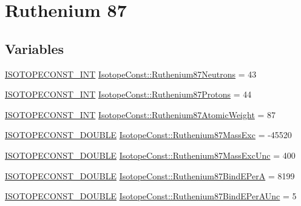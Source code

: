 \hypertarget{group___isotope_const-_ruthenium-_ru87}{}\section{Ruthenium 87}
\label{group___isotope_const-_ruthenium-_ru87}
\subsection*{Variables}
\begin{DoxyCompactItemize}
\item 
\mbox{\hyperlink{group___isotope_const-_macros_ga5f18360b3e99483a35c32d789e62621c}{I\+S\+O\+T\+O\+P\+E\+C\+O\+N\+S\+T\+\_\+\+I\+NT}} \mbox{\hyperlink{group___isotope_const-_ruthenium-_ru87_gaf2d2519843df393d99ad752be4768a2d}{Isotope\+Const\+::\+Ruthenium87\+Neutrons}} = 43
\item 
\mbox{\hyperlink{group___isotope_const-_macros_ga5f18360b3e99483a35c32d789e62621c}{I\+S\+O\+T\+O\+P\+E\+C\+O\+N\+S\+T\+\_\+\+I\+NT}} \mbox{\hyperlink{group___isotope_const-_ruthenium-_ru87_gab347314faee7a6a6e3c1c3dede76cc90}{Isotope\+Const\+::\+Ruthenium87\+Protons}} = 44
\item 
\mbox{\hyperlink{group___isotope_const-_macros_ga5f18360b3e99483a35c32d789e62621c}{I\+S\+O\+T\+O\+P\+E\+C\+O\+N\+S\+T\+\_\+\+I\+NT}} \mbox{\hyperlink{group___isotope_const-_ruthenium-_ru87_ga8ae57cbdb18f42a3463b75e4c5e5cc97}{Isotope\+Const\+::\+Ruthenium87\+Atomic\+Weight}} = 87
\item 
\mbox{\hyperlink{group___isotope_const-_macros_ga8f45a7272ce02c0b4c65c44636ed719a}{I\+S\+O\+T\+O\+P\+E\+C\+O\+N\+S\+T\+\_\+\+D\+O\+U\+B\+LE}} \mbox{\hyperlink{group___isotope_const-_ruthenium-_ru87_ga05d06d116b8eed3fcca034258c104a70}{Isotope\+Const\+::\+Ruthenium87\+Mass\+Exc}} = -\/45520
\item 
\mbox{\hyperlink{group___isotope_const-_macros_ga8f45a7272ce02c0b4c65c44636ed719a}{I\+S\+O\+T\+O\+P\+E\+C\+O\+N\+S\+T\+\_\+\+D\+O\+U\+B\+LE}} \mbox{\hyperlink{group___isotope_const-_ruthenium-_ru87_gafdba6e7b9deb46c092a76e0fddfdf7cd}{Isotope\+Const\+::\+Ruthenium87\+Mass\+Exc\+Unc}} = 400
\item 
\mbox{\hyperlink{group___isotope_const-_macros_ga8f45a7272ce02c0b4c65c44636ed719a}{I\+S\+O\+T\+O\+P\+E\+C\+O\+N\+S\+T\+\_\+\+D\+O\+U\+B\+LE}} \mbox{\hyperlink{group___isotope_const-_ruthenium-_ru87_gaf6683a6ea94494869b176bf05aabb4bb}{Isotope\+Const\+::\+Ruthenium87\+Bind\+E\+PerA}} = 8199
\item 
\mbox{\hyperlink{group___isotope_const-_macros_ga8f45a7272ce02c0b4c65c44636ed719a}{I\+S\+O\+T\+O\+P\+E\+C\+O\+N\+S\+T\+\_\+\+D\+O\+U\+B\+LE}} \mbox{\hyperlink{group___isotope_const-_ruthenium-_ru87_gabb9eb11acbf8d5e42ada919f57b6f533}{Isotope\+Const\+::\+Ruthenium87\+Bind\+E\+Per\+A\+Unc}} = 5

\end{DoxyCompactItemize}
